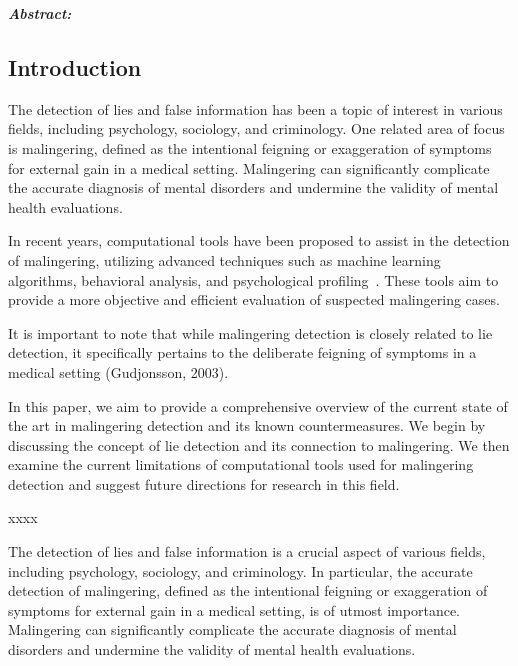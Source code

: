 \documentclass[onecolumn, compsoc,10pt]{IEEEtran}
\begin{document}
  
\maketitle  

{\bf \sffamily \fontsize{10}{12}\selectfont \noindent   
  {\normalfont \itshape Abstract:}

}
  
\vspace{10pt} 

\subsection*{Introduction}


The detection of lies and false information has been a topic of interest in various fields, including psychology, sociology, and criminology. One related area of focus is malingering, defined as the intentional feigning or exaggeration of symptoms for external gain in a medical setting. Malingering can significantly complicate the accurate diagnosis of mental disorders and undermine the validity of mental health evaluations.

In recent years, computational tools have been proposed to assist in the detection of malingering, utilizing advanced techniques such as machine learning algorithms, behavioral analysis, and psychological profiling~\cite{rogers2008clinical}. These tools aim to provide a more objective and efficient evaluation of suspected malingering cases.

It is important to note that while malingering detection is closely related to lie detection, it specifically pertains to the deliberate feigning of symptoms in a medical setting (Gudjonsson, 2003).

In this paper, we aim to provide a comprehensive overview of the current state of the art in malingering detection and its known countermeasures. We begin by discussing the concept of lie detection and its connection to malingering. We then examine the current limitations of computational tools used for malingering detection and suggest future directions for research in this field.


xxxx




The detection of lies and false information is a crucial aspect of various fields, including psychology, sociology, and criminology. In particular, the accurate detection of malingering, defined as the intentional feigning or exaggeration of symptoms for external gain in a medical setting, is of utmost importance. Malingering can significantly complicate the accurate diagnosis of mental disorders and undermine the validity of mental health evaluations.
\end{document}

